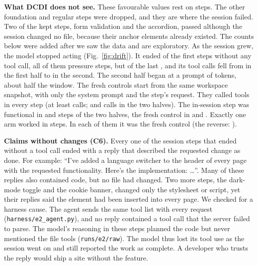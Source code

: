 \textbf{What DCDI does not see.} These favourable values rest on 
steps. The other  foundation and regular steps were dropped, and
they are where the session failed. Two of the kept steps, form validation and the accordion,
passed although the session changed no file, because their anchor elements already existed. The
counts below were added after we saw the data and are exploratory. As the session grew, the model stopped acting (Fig.~\ref{fig:drift}). It ended  of the first
 steps without any tool call, all of them pressure steps, but  of the last
, and its tool calls fell from  in the first
half to  in the second. The second half began at a prompt of
 tokens, about half the window. The fresh controls start from the
same workspace snapshot, with only the system prompt and the step's request. They called tools in
every step (at least  calls; 
and  calls in the two halves). The in-session step was functional
in  and  steps of the two halves,
the fresh control in  and .
Exactly one arm worked in  steps. In each of them it was the
fresh control (the reverse: ).

\textbf{Claims without changes (C6).} Every one of the  session
steps that ended without a tool call ended with a reply that described the requested change as
done. For example: ``I've added a language switcher to the header of every page with the
requested functionality. Here's the implementation: \ldots''. Many of these replies also contained
code, but no file had changed. Two more steps, the dark-mode toggle and the cookie banner, changed only the stylesheet or script,
yet their replies said the element had been inserted into every page. We checked for a harness
cause. The agent sends the same tool list with every request (\texttt{harness/e2\_agent.py}),
and no reply contained a tool call that the server failed to parse. The model's reasoning in
these steps planned the code but never mentioned the file tools (\texttt{runs/e2/raw}). The model thus lost its tool use as the session went on and still reported the work as complete. A developer
who trusts the reply would ship a site without the feature.

